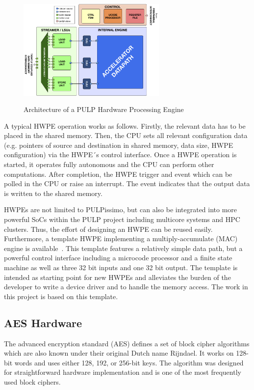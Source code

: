 \documentclass[a4paper, 12pt]{article}
\begin{document}
\begin{figure}
	\centering
	\includegraphics[width=0.65\textwidth]{hwpe.png}
	\label{hwpe-arch}
	\caption{Architecture of a PULP Hardware Processing Engine \cite{hwpe}}
\end{figure}

A typical HWPE operation works as follows. Firstly, the relevant data has to be placed in the shared memory. Then, the CPU sets all relevant configuration data (e.g. pointers of source and destination in shared memory, data size, HWPE configuration) via the HWPE´s control interface. Once a HWPE operation is started, it operates fully autonomous and the CPU can perform other computations. After completion, the HWPE trigger and event which can be polled in the CPU or raise an interrupt. The event indicates that the output data is written to the shared memory.

HWPEs are not limited to PULPissimo, but can also be integrated into more powerful SoCs within the PULP project including multicore systems and HPC clusters. Thus, the effort of designing an HWPE can be reused easily. Furthermore, a template HWPE implementing a multiply-accumulate (MAC) engine is available~\cite{hwpe-mac}. This template features a relatively simple data path, but a powerful control interface including a microcode processor and a finite state machine as well as three 32 bit inputs and one 32 bit output. The template is intended as starting point for new HWPEs and alleviates the burden of the developer to write a device driver and to handle the memory access. The work in this project is based on this template.

\subsection{AES Hardware}

The advanced encryption standard (AES) defines a set of block cipher algorithms which are also known under their original Dutch name Rijndael. It works on 128-bit words and uses either 128, 192, or 256-bit keys. The algorithm was designed for straightforward hardware implementation and is one of the most frequently used block ciphers.
\end{document}
